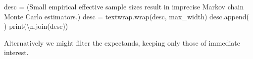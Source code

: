 \documentclass[
  letterpaper,
  DIV=11,
  numbers=noendperiod]{scrartcl}
\newenvironment{Shaded}{\begin{snugshade}}{\end{snugshade}}
\newcommand{\BuiltInTok}[1]{\textcolor[rgb]{0.00,0.23,0.31}{#1}}
\newcommand{\CharTok}[1]{\textcolor[rgb]{0.13,0.47,0.30}{#1}}
\newcommand{\NormalTok}[1]{\textcolor[rgb]{0.00,0.23,0.31}{#1}}
\newcommand{\OperatorTok}[1]{\textcolor[rgb]{0.37,0.37,0.37}{#1}}
\newcommand{\StringTok}[1]{\textcolor[rgb]{0.13,0.47,0.30}{#1}}
\begin{document}
\begin{Shaded}
\begin{Highlighting}[]
\NormalTok{    desc }\OperatorTok{=}\NormalTok{ (}\StringTok{\textquotesingle{}Small empirical effective sample sizes result in \textquotesingle{}}
            \StringTok{\textquotesingle{}imprecise Markov chain Monte Carlo estimators.\textquotesingle{}}\NormalTok{)}
\NormalTok{    desc }\OperatorTok{=}\NormalTok{ textwrap.wrap(desc, max\_width)}
\NormalTok{    desc.append(}\StringTok{\textquotesingle{} \textquotesingle{}}\NormalTok{)}
    \BuiltInTok{print}\NormalTok{(}\StringTok{\textquotesingle{}}\CharTok{\textbackslash{}n}\StringTok{\textquotesingle{}}\NormalTok{.join(desc))}
\end{Highlighting}
\end{Shaded}

Alternatively we might filter the expectands, keeping only those of
immediate interest.
\end{document}
